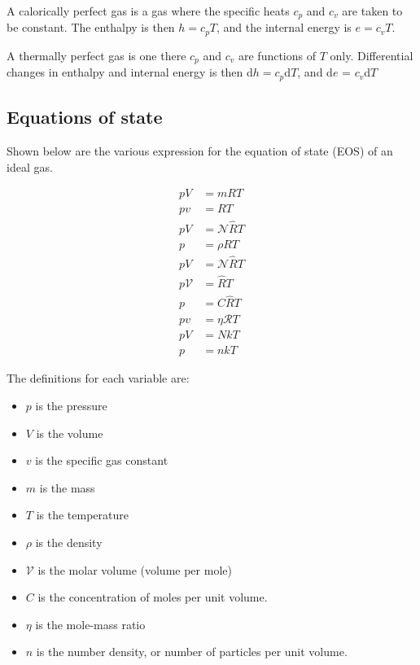 \documentclass[10pt]{article}
\begin{document}
\begin{flushleft}
\begin{definition}
A calorically perfect gas is a gas where the specific heats $c_p$ and $c_v$ are taken to be constant. The enthalpy is then $h = c_p T$, and the internal energy is $e = c_v T$.
\end{definition}

\begin{definition}
A thermally perfect gas is one there $c_p$ and $c_v$ are functions of $T$ only. Differential changes in enthalpy and internal energy is then d$h = c_p$d$T$, and d$e$ = $c_v$d$T$
\end{definition}

\subsection{Equations of state}

Shown below are the various expression for the equation of state (EOS) of an ideal gas.

\begin{subequations}
\begin{align}
    pV &= mRT  
    \\ pv &= RT
    \\ pV &= \mathcal{N} \hat{R} T
    \\ p &= \rho R T
    \\ p V &= \mathcal{N} \hat{R} T
    \\ p \mathcal{V} &= \hat{R} T
    \\ p &= C\hat{R}T
    \\ pv &= \eta \mathcal{R} T
    \\ pV &= NkT
    \\ p &= nkT
\end{align}
\end{subequations}

The definitions for each variable are:

\begin{itemize}
    \item $p$ is the pressure
    \item $V$ is the volume
    \item $v$ is the specific gas constant
    \item $m$ is the mass
    \item $T$ is the temperature
    \item $\rho$ is the density
    \item $\mathcal{V}$ is the molar volume (volume per mole)
    \item $C$ is the concentration of moles per unit volume.
    \item $\eta$ is the mole-mass ratio
    \item $n$ is the number density, or number of particles per unit volume.
\end{itemize}




\end{flushleft}
\end{document}
